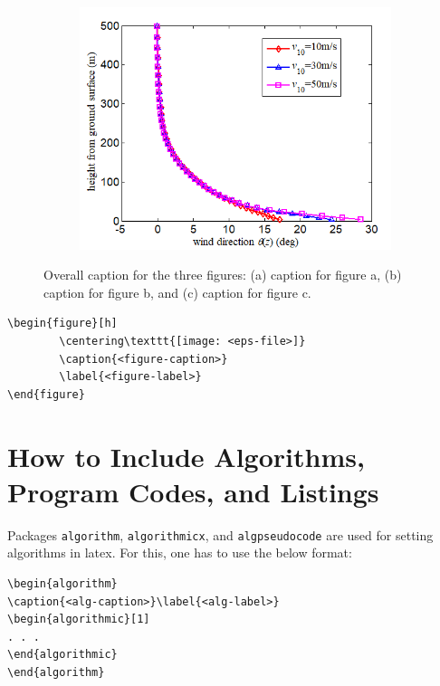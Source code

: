 \documentclass[10pt,a4paper]{article}
\begin{document}
\begin{appendices}
\begin{figure}[!ht]
\begin{subfigure}{0.3\textwidth}
        \includegraphics[width=\linewidth]{figures/fig_c.png}
        \caption{}
    \end{subfigure}
    \caption{Overall caption for the three figures: (a) caption for figure a, (b) caption for figure b, and (c) caption for figure c.}
    \label{fig:multi_figs}
\end{figure}


\begin{verbatim}
\begin{figure}[h]
        \centering\texttt{[image: <eps-file>]}
        \caption{<figure-caption>}
        \label{<figure-label>}
\end{figure}
\end{verbatim}


\section{How to Include Algorithms, Program Codes, and Listings}\label{sec8}
Packages \verb+algorithm+, \verb+algorithmicx+, and \verb+algpseudocode+ are used for setting algorithms in latex.
For this, one has to use the below format:

\begin{verbatim}
\begin{algorithm}
\caption{<alg-caption>}\label{<alg-label>}
\begin{algorithmic}[1]
. . .
\end{algorithmic}
\end{algorithm}
\end{verbatim}


\end{appendices}
\end{document}
